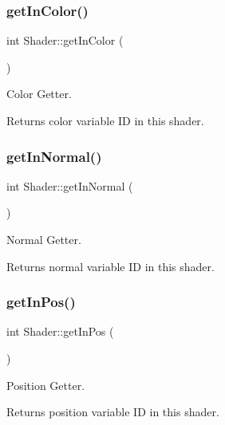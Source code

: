 \subsubsection{\texorpdfstring{get\+In\+Color()}{getInColor()}}
{\footnotesize\ttfamily int Shader\+::get\+In\+Color (\begin{DoxyParamCaption}{ }\end{DoxyParamCaption})}



Color Getter. 

\begin{DoxyReturn}{Returns}
color variable ID in this shader. 
\end{DoxyReturn}
\mbox{\label{class_shader_a9647f6a0356188f9f56787dbebde4731}} 
\subsubsection{\texorpdfstring{get\+In\+Normal()}{getInNormal()}}
{\footnotesize\ttfamily int Shader\+::get\+In\+Normal (\begin{DoxyParamCaption}{ }\end{DoxyParamCaption})}



Normal Getter. 

\begin{DoxyReturn}{Returns}
normal variable ID in this shader. 
\end{DoxyReturn}
\mbox{\label{class_shader_ad52dea081c158e54bd3dcd5168623a3f}} 
\subsubsection{\texorpdfstring{get\+In\+Pos()}{getInPos()}}
{\footnotesize\ttfamily int Shader\+::get\+In\+Pos (\begin{DoxyParamCaption}{ }\end{DoxyParamCaption})}



Position Getter. 

\begin{DoxyReturn}{Returns}
position variable ID in this shader. 
\end{DoxyReturn}
\mbox{\label{class_shader_aad0dc2b502af0bcf6c5aa99e60fc296a}} 
